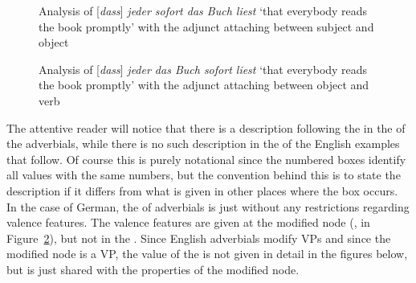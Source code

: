 \begin{figure}

\caption{\label{fig-j-m-b-l}Analysis of [\emph{dass}] \emph{jeder sofort das Buch liest} `that everybody reads the
  book promptly' with the adjunct attaching between subject and object}
\end{figure}


\begin{figure}
\caption{\label{fig-j-b-m-l}Analysis of [\emph{dass}] \emph{jeder das Buch sofort liest} `that everybody reads the
  book promptly' with the adjunct attaching between object and verb}
\end{figure}
The attentive reader will notice that there is a description following the  in the \modv of
the adverbials, while there is no such description in the \modvs of the English examples that
follow. Of course this is purely notational since the numbered boxes identify all values with the
same numbers, but the convention behind this is to state the description if it differs from what is
given in other places where the box occurs. In the case of German, the \modv of adverbials is just
 without any restrictions regarding valence features. The valence features are given at
the modified node (\eg \spr \eliste, \comps {} in
Figure~\ref{fig-j-b-m-l}), but not in the \modv. Since English adverbials modify VPs and since the
modified node is a VP, the value of the \modv is not given in detail in the figures below, but is just shared with the
properties of the modified node.



